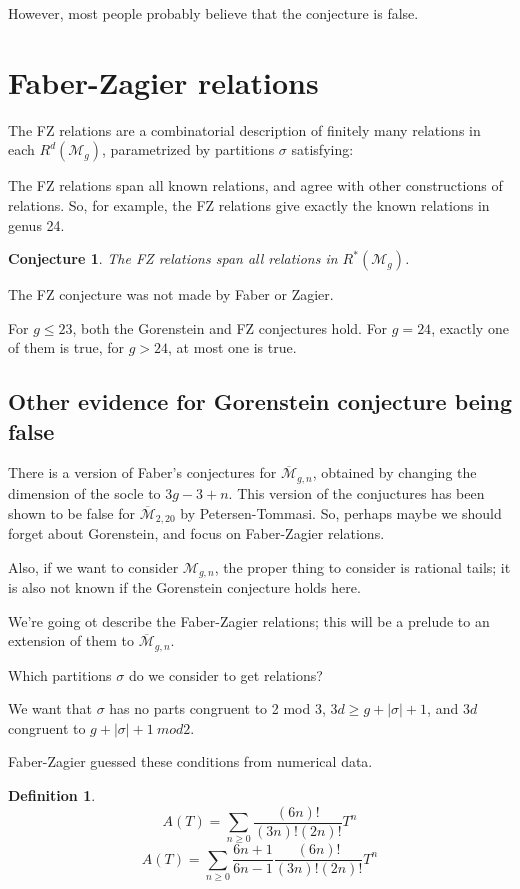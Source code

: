 \documentclass{amsart}
\newtheorem{definition}{Definition}
\newtheorem{conjecture}{Conjecture}
\newcommand{\Mbar}{\overline{\mathcal{M}}}
\newcommand{\M}{\mathcal{M}}
\begin{document}
However, most people probably believe that the conjecture is false.

\section{Faber-Zagier relations}
The FZ relations are a combinatorial description of finitely many relations in each $R^d(\M_g)$, parametrized by partitions $\sigma$ satisfying:


The FZ relations span all known relations, and agree with other constructions of relations.  So, for example, the FZ relations give exactly the known relations in genus 24.

\begin{conjecture}
The FZ relations span all relations in $R^*(\M_g)$.
\end{conjecture}

The FZ conjecture was not made by Faber or Zagier.

For $g\leq 23$, both the Gorenstein and FZ conjectures hold.  For $g=24$, exactly one of them is true, for $g>24$, at most one is true.

\subsection{Other evidence for Gorenstein conjecture being false}
There is a version of Faber's conjectures for $\Mbar_{g,n}$, obtained by changing the dimension of the socle to $3g-3+n$.  This version of the conjuctures has been shown to be false for $\Mbar_{2,20}$ by Petersen-Tommasi.  So, perhaps maybe we should forget about Gorenstein, and focus on Faber-Zagier relations.

Also, if we want to consider $\M_{g,n}$, the proper thing to consider is rational tails; it is also not known if the Gorenstein conjecture holds here.

We're going ot describe the Faber-Zagier relations; this will be a prelude to an extension of them to $\Mbar_{g,n}$.

Which partitions $\sigma$ do we consider to get relations?

We want that $\sigma$ has no parts congruent to 2 mod 3, $3d\geq g+|\sigma|+1$, and $3d$ congruent to $g+|\sigma|+1\ mod 2$.

Faber-Zagier guessed these conditions from numerical data.

\begin{definition}
$$A(T)=\sum_{n\geq 0} \frac{(6n)!}{(3n)!(2n)!} T^n$$
$$A(T)=\sum_{n\geq 0} \frac{6n+1}{6n-1}\frac{(6n)!}{(3n)!(2n)!} T^n$$

\end{definition}
\end{document}
